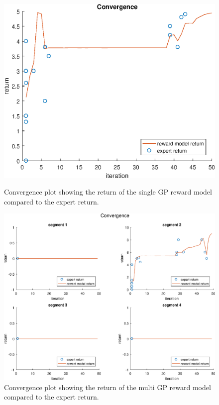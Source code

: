 \documentclass[mscThesis.tex]{subfiles}
\begin{document}
\begin{figure}[!htb]
    \centering
    \begin{minipage}{.5\textwidth}
        \centering
        \includegraphics[width=\textwidth, keepaspectratio=1]{figures/results/viapoint/convergence_single_manual.eps}
        \caption{Convergence plot showing the return of the single GP reward model compared to the expert return.}
        \label{fig:vp-single-manual-con}
    \end{minipage}%
    \begin{minipage}{0.5\textwidth}
        \centering
        \includegraphics[width=\textwidth, keepaspectratio=1]{figures/results/viapoint/convergence_multi_manual.eps}
        \caption{Convergence plot showing the return of the multi GP reward model compared to the expert return.}
        \label{fig:vp-multi-manual-con}
    \end{minipage}
\end{figure}
\end{document}

